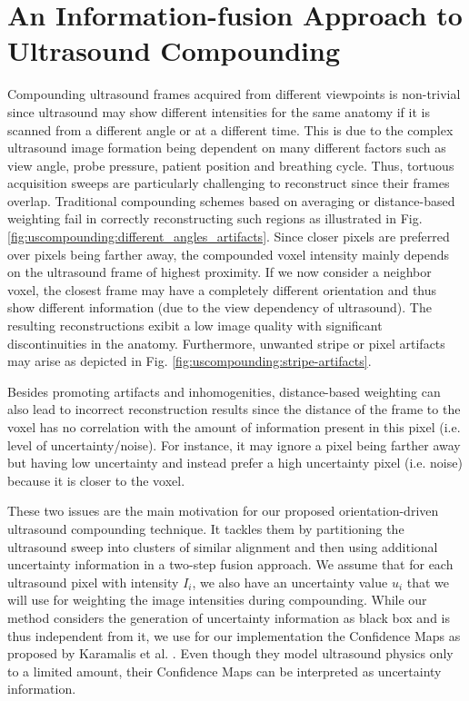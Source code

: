 \section{An Information-fusion Approach to Ultrasound Compounding}
\label{sec:uscompounding:clustering}

Compounding ultrasound frames acquired from different viewpoints is non-trivial since ultrasound may show different intensities for the same anatomy if it is scanned from a different angle or at a different time.
This is due to the complex ultrasound image formation being dependent on many different factors such as view angle, probe pressure, patient position and breathing cycle.
Thus, tortuous acquisition sweeps are particularly challenging to reconstruct since their frames overlap.
Traditional compounding schemes based on averaging or distance-based weighting fail in correctly reconstructing such regions as illustrated in Fig. \ref{fig:uscompounding:different_angles_artifacts}.
Since closer pixels are preferred over pixels being farther away, the compounded voxel intensity mainly depends on the ultrasound frame of highest proximity.
If we now consider a neighbor voxel, the closest frame may have a completely different orientation and thus show different information (due to the view dependency of ultrasound).
The resulting reconstructions exibit a low image quality with significant discontinuities in the anatomy.
Furthermore, unwanted stripe or pixel artifacts may arise as depicted in Fig. \ref{fig:uscompounding:stripe-artifacts}. 

Besides promoting artifacts and inhomogenities, distance-based weighting can also lead to incorrect reconstruction results since the distance of the frame to the voxel has no correlation with the amount of information present in this pixel (i.e. level of uncertainty/noise).
For instance, it may ignore a pixel being farther away but having low uncertainty and instead prefer a high uncertainty pixel (i.e. noise) because it is closer to the voxel.

These two issues are the main motivation for our proposed orientation-driven ultrasound compounding technique.
It tackles them by partitioning the ultrasound sweep into clusters of similar alignment and then using additional uncertainty information in a two-step fusion approach.
We assume that for each ultrasound pixel with intensity $I_i$, we also have an uncertainty value $u_i$ that we will use for weighting the image intensities during compounding.
While our method considers the generation of uncertainty information as black box and is thus independent from it, we use for our implementation the Confidence Maps as proposed by Karamalis et al. \cite{Karamalis12}.
Even though they model ultrasound physics only to a limited amount, their Confidence Maps can be interpreted as uncertainty information. 

